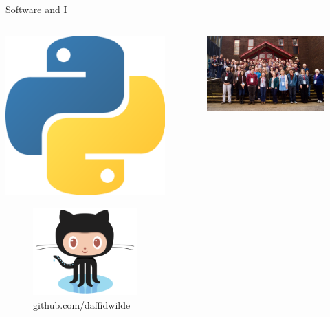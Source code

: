 \documentclass{beamer}
\begin{document}
\begin{frame}{Software and I}

    \begin{columns}[T]
        \begin{column}{.5\textwidth}
            \centering
            \vspace{20pt}
            \includegraphics[width=.5\linewidth]{python.png}\\
            \vspace{10pt}
            \begin{figure}
                \includegraphics[width=.5\linewidth]{github.png}
                \caption{\tiny github.com/daffidwilde}
            \end{figure}
        \end{column}
        \begin{column}{.5\textwidth}
            \centering
            \begin{figure}
                \includegraphics[width=.9\linewidth]{collabw18.jpg}

\end{figure}
\end{column}
\end{columns}
\end{frame}
\end{document}

